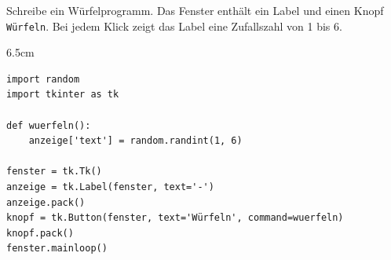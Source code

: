 \question[5]
Schreibe ein Würfelprogramm. Das Fenster enthält ein Label und einen Knopf \texttt{Würfeln}. Bei jedem Klick zeigt das Label eine Zufallszahl von 1 bis 6.
\begin{solutionbox}{6.5cm}
\begin{lstlisting}
import random
import tkinter as tk

def wuerfeln():
    anzeige['text'] = random.randint(1, 6)

fenster = tk.Tk()
anzeige = tk.Label(fenster, text='-')
anzeige.pack()
knopf = tk.Button(fenster, text='Würfeln', command=wuerfeln)
knopf.pack()
fenster.mainloop()
\end{lstlisting}
\end{solutionbox}
